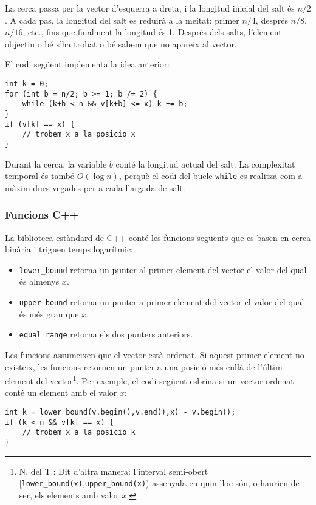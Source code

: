 La cerca passa per la vector d'esquerra a
dreta, i la longitud inicial del salt és $n/2$.
A cada pas, la longitud del salt es reduirà a la meitat:
primer $n/4$, després $n/8$, $n/16$, etc., fins que
finalment la longitud és 1.
Després dels salts, l'element objectiu o bé
s'ha trobat o bé sabem que no apareix al vector.

El codi següent implementa la idea anterior:
\begin{lstlisting}
int k = 0;
for (int b = n/2; b >= 1; b /= 2) {
    while (k+b < n && v[k+b] <= x) k += b;
}
if (v[k] == x) {
    // trobem x a la posicio x
}
\end{lstlisting}

Durant la cerca, la variable $b$
conté la longitud actual del salt.
La complexitat temporal és també $O(\log n)$,
perquè el codi del bucle \texttt{while}
es realitza com a màxim dues vegades per a cada llargada de salt.

\subsubsection{Funcions C++}

La biblioteca estàndard de C++ conté les funcions següents
que es basen en cerca binària i triguen temps logarítmic:

\begin{itemize}
\item \texttt{lower\_bound} retorna un punter al
primer element del vector el valor del qual és almenys $x$.
\item \texttt{upper\_bound} retorna un punter a
primer element del vector el valor del qual és més gran que $x$.
\item \texttt{equal\_range} retorna els dos punters anteriors.
\end{itemize}

Les funcions assumeixen que el vector està ordenat.
Si aquest primer element no existeix, les funcions retornen un
punter a una posició més enllà de l'últim element del vector\footnote{
N. del T.: Dit d'altra manera: l'interval semi-obert
[\texttt{lower\_bound(x)},\texttt{upper\_bound(x)})
  assenyala en quin lloc són, o haurien de ser, els elements amb
  valor $x$.}.
Per exemple, el codi següent esbrina si
un vector ordenat conté un element amb el valor $x$:

\begin{lstlisting}
int k = lower_bound(v.begin(),v.end(),x) - v.begin();
if (k < n && v[k] == x) {
    // trobem x a la posicio k
}
\end{lstlisting}

